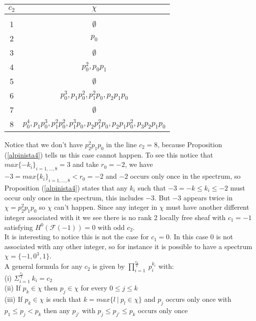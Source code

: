\documentclass[
	oldfontcommands,
	sumario=abnt-6027-2012,
	12pt,			%
	openright,		%
	oneside,		%
	a4paper,		%
	english,		%
	brazil			%
	]{imecc-unicamp}
\begin{document}
\begin{center}
 \begin{tabular}{||c | c||} 
 \hline
 $c_2$ & $\chi$ \\ [0.5ex] 
 \hline\hline
 \\[-1em]
 1 & $\emptyset$ \\ 
 \hline
 2 & $p_0$ \\
 \hline
 3 & $\emptyset$ \\
 \hline
 4 & $p_0 ^2,p_0 p_1$ \\
 \hline
 5 & $\emptyset$  \\
 \hline
 6 & $p_0^3,p_1p_0^2,p_1^2 p_0, p_2 p_1 p_0$ \\
 \hline
 7 & $\emptyset$ \\
 \hline
 8 & $p_0^4,p_1p_0^3,p_1^2p_0^2,p_1^3p_0,p_2p_1^2p_0,p_2p_1p_0^2,p_3p_2p_1p_0$ \\ [1ex] 
 \hline
\end{tabular}
\end{center}
Notice that we don't have $p_2^2p_1p_0$ in the line $c_2=8$, because Proposition (\ref{alpinista4}) tells us this case cannot happen. To see this notice that $max \{-k_i\}_{i=1,...,8}=3$ and take $r_0=-2$, we have $-3=max \{k_i\}_{i=1,...,8} <r_0=-2$ and $-2$ occurs only once in the spectrum, so Proposition (\ref{alpinista4}) states that any $k_i$ such that $-3=-k \leq k_i \leq -2$ must occur only once in the spectrum, this includes $-3$. But $-3$ appears twice in $\chi =p_2^2 p_1 p_0$ so $\chi$ can't happen.
Since any integer in $\chi$ must have another different integer associated with it we see there is no rank 2 locally free sheaf with $c_1=-1$ satisfying $H^0(\mathcal{F}(-1))=0$ with odd $c_2$. \\
It is interesting to notice this is not the case for $c_1=0$. In this case 0 is not associated with any other integer, so for instance it is possible to have a spectrum $\chi = \{-1,0^3,1 \}$. \\
A general formula for any $c_2$ is given by $\prod_{i=1}^{\frac{c_2}{2}} \ p_i^{k_i}$ with: \\
(i) $\Sigma_{i=1}^{\frac{c_2}{2}} \ k_i=c_2$ \\
(ii) If $p_k \in \chi$ then $p_j \in \chi$ for every $0\leq j \leq k$ \\
(iii) If $p_k \in \chi$ is such that $k= max \{l \ | \ p_l \in \chi \}$ and $p_j$ occurs only once with $p_1 \leq p_j < p_k$ then any $p_{j'}$ with $p_j \leq p_{j'} \leq p_k$ occurs only once
\end{document}
